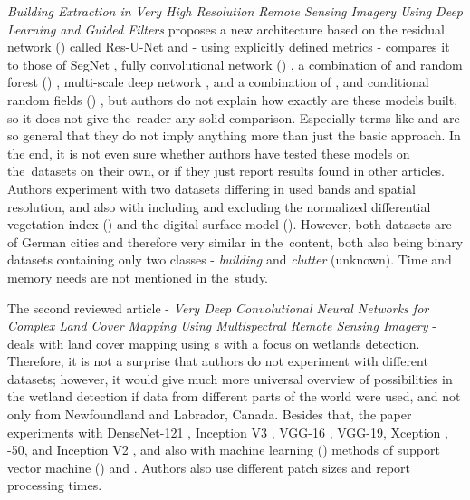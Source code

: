 \textit{Building Extraction in Very High Resolution Remote Sensing Imagery Using Deep Learning and Guided Filters} proposes a new  architecture based on the residual network () \cite{resnet} called Res-U-Net and - using explicitly defined metrics - compares it to those of SegNet \cite{segnet}, fully convolutional network () \cite{fcn}, a combination of  and random forest () \cite{rf}, multi-scale deep network \cite{hierarchical-labeling}, and a combination of ,  and conditional random fields () \cite{hierarchical-labeling}, but authors do not explain how exactly are these models built, so it does not give the~reader any solid comparison. Especially terms like  and  are so general that they do not imply anything more than just the basic approach. In the end, it is not even sure whether authors have tested these models on the~datasets on their own, or if they just report results found in other articles. Authors experiment with two datasets differing in used bands and spatial resolution, and also with including and excluding the normalized differential vegetation index () and the digital surface model (). However, both datasets are of German cities and therefore very similar in the~content, both also being binary datasets containing only two classes - \textit{building} and \textit{clutter} (unknown). Time and memory needs are not mentioned in the~study.

The second reviewed article - \textit{Very Deep Convolutional Neural Networks for Complex Land Cover Mapping Using Multispectral Remote Sensing Imagery} - deals with land cover mapping using s with a focus on wetlands detection. Therefore, it is not a surprise that authors do not experiment with different datasets; however, it would give much more universal overview of  possibilities in the wetland detection if data from different parts of the world were used, and not only from Newfoundland and Labrador, Canada. Besides that, the paper experiments with DenseNet-121 \cite{densenet}, Inception V3 \cite{inception}, VGG-16 \cite{vgg}, VGG-19, Xception \cite{xception}, -50, and Inception  V2 \cite{inception-resnet}, and also with machine learning () methods of support vector machine () \cite{svm} and . Authors also use different patch sizes and report processing times.

